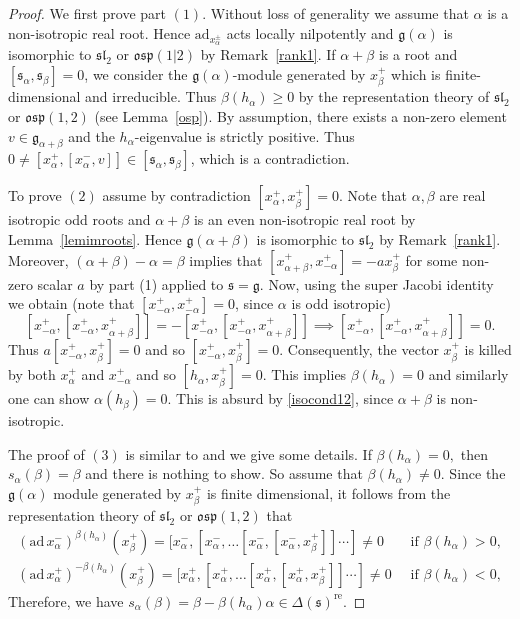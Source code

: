 \documentclass[11pt,reqno]{amsart}
\theoremstyle{plain}
\theoremstyle{definition}
\theoremstyle{remark}
\newcommand{\lie}[1]{\mathfrak{#1}}
\numberwithin{equation}{section}
\begin{document}
\begin{proof}
    We first prove part $(1).$ Without loss of generality we assume that $\alpha$ is a non-isotropic real root. Hence $\mathrm{ad}_{x_{\alpha}^{\pm}}$ acts locally nilpotently and $\lie g(\alpha)$ is isomorphic to $\lie{sl}_2$ or $\lie{osp}(1|2)$ by Remark~\ref{rank1}. If $\alpha+\beta$ is a root and $[\lie{s}_\alpha,\lie{s}_\beta]=0$, we consider the  $\lie g(\alpha)$-module generated by $x_{\beta}^+$ which is finite-dimensional and irreducible.  Thus $\beta(h_{\alpha})\geq 0$ by the representation theory of $\lie{sl}_2$ or $\lie{osp}(1,2)$ (see Lemma~\ref{osp}). By assumption, there exists a non-zero element $v\in \lie g_{\alpha+\beta}$ and the $h_{\alpha}$-eigenvalue is strictly positive. Thus $0\neq [x_{\alpha}^{+},[x_{\alpha}^{-},v]]\in [\lie{s}_\alpha,\lie{s}_\beta]$, which is a contradiction.
    
    To prove $(2)$ assume by contradiction $[x^+_\alpha,x^+_\beta]=0.$ Note that $\alpha,\beta$ are real isotropic odd roots and $\alpha+\beta$ is an even non-isotropic real root by Lemma~\ref{lemimroots}. Hence $\lie{g}(\alpha+\beta)$ is isomorphic to $\lie{sl}_2$ by Remark~\ref{rank1}. Moreover, $(\alpha+\beta)-\alpha=\beta$ implies that $[x^+_{\alpha+\beta},x^+_{-\alpha}]=-ax^+_\beta$ for some non-zero scalar $a$ by part (1) applied to $\lie s=\lie g$. Now, using the super Jacobi identity we obtain (note that $[x^+_{-\alpha},x^+_{-\alpha}]=0$, since $\alpha$ is odd isotropic)
    $$[x^+_{-\alpha},[x^+_{-\alpha},x^+_{\alpha+\beta}]]= -[x^+_{-\alpha},[x^+_{-\alpha},x^+_{\alpha+\beta}]]\implies [x^+_{-\alpha},[x^+_{-\alpha},x^+_{\alpha+\beta}]]=0.$$
    Thus $a[x^+_{-\alpha},x^+_\beta]=0$ and so $[x^+_{-\alpha},x^+_{\beta}]=0.$ Consequently, the vector $x^+_\beta$ is killed by both $x^+_\alpha$ and $x^+_{-\alpha}$ and so $[h_\alpha,x^+_\beta]=0.$ This implies $\beta(h_\alpha)=0$ and similarly one can show $\alpha(h_\beta)=0.$ This is absurd by \eqref{isocond12}, since $\alpha+\beta$ is non-isotropic. 
    
The proof of $(3)$ is similar to \cite[Proposition 2.4]{idv2023root} and we give some details. If $\beta(h_\alpha)=0,$ then $s_\alpha(\beta)=\beta$
        and there is nothing to show. So assume that $\beta(h_\alpha)\neq 0.$ Since the $\lie g(\alpha)$ module generated by $x_\beta^+$ is finite dimensional, it follows from the representation theory of $\lie{sl}_2$ or $\lie{osp}(1,2)$ that 
        \begin{align*}
            (\mathrm{ad}\, x_\alpha^-)^{\beta(h_\alpha)}(x_{\beta}^+)=[x_\alpha^-,[x_\alpha^-,\dots [x_\alpha^-,[x_\alpha^-, x_{\beta}^+]]\cdots ]\neq 0 &\ \text{ if }\beta(h_\alpha)>0,\\
            (\mathrm{ad}\, x_\alpha^+)^{-\beta(h_\alpha)}(x_{\beta}^+)=[x_\alpha^+,[x_\alpha^+,\dots [x_\alpha^+,[x_\alpha^+, x_{\beta}^+]]\cdots ]\neq 0 &\ \text{ if }\beta(h_\alpha)<0,
        \end{align*}
        Therefore, we have $s_\alpha(\beta)=\beta-\beta(h_\alpha)\alpha\in \Delta(\lie s)^{\mathrm{re}}$.
\end{proof}
\end{document}

